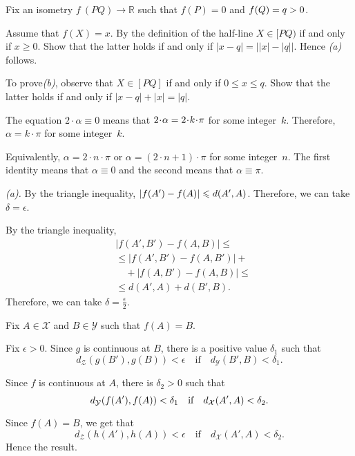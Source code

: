 \begin{multicols}{2}
Fix an isometry $f\:(P Q)\to \mathbb{R}$ such that $f(P)=0$ and $f(Q)\z=q>0$.

Assume that $f(X)=x$.
By the definition of the half-line $X\in[PQ)$ if and only if $x\ge 0$.
Show that the latter holds if and only if 
$|x-q|=\bigl||x|-|q|\bigr|$.
Hence \textit{(a)} follows.

To prove\textit{(b)}, observe that $X\in [PQ]$ if and only if $0\le x\le q$.
Show that the latter holds if and only if 
$|x-q|+|x|=|q|$.

The equation
$2\cdot\alpha\equiv 0$
means that $2\cdot\alpha\z=2\cdot k\cdot\pi$ for some integer~$k$.
Therefore,
$\alpha=k\cdot\pi$ for some integer~$k$.

Equivalently, $\alpha=2\cdot n\cdot \pi$ or $\alpha=(2\cdot n+1)\cdot \pi$ for some integer~$n$.
The first identity means that $\alpha\equiv 0$ and the second means that $\alpha\equiv \pi$.

 \textit{(a).}
By the triangle inequality,
$|f(A')\z-f(A)|\le d(A',A)$.
Therefore, we can take $\delta=\epsilon$.

By the triangle inequality,
\begin{align*}
&|f(A',B')-f(A,B)|
\le 
\\
&\le|f(A',B')-f(A,B')|+
\\
&\quad+
|f(A,B')-f(A,B)|\le
\\
&\le d(A',A)+d(B',B).
\end{align*}
Therefore, we can take $\delta=\tfrac\epsilon2$.

Fix $A\in \mathcal{X}$ and $B\in\mathcal{Y}$
such that $f(A)=B$.

Fix $\epsilon>0$.
Since $g$ is continuous at $B$, there is a positive value $\delta_1$ such that 
$$d_{\mathcal{Z}}(g(B'),g(B))<\epsilon
\quad
\text{if}
\quad
d_{\mathcal{Y}}(B',B)<\delta_1.$$ 

Since $f$ is continuous at $A$, there is $\delta_2>0$ such that 
$$d_{\mathcal{Y}}(f(A'),f(A))\z<\delta_1
\quad
\text{if}
\quad
d_{\mathcal{X}}(A',A)<\delta_2.$$ 

Since $f(A)=B$, we get that
$$d_{\mathcal{Z}}(h(A'),h(A))<\epsilon
\quad
\text{if}
\quad
d_{\mathcal{X}}(A',A)<\delta_2.$$ 
Hence the result.

\setcounter{eqtn}{0}


\end{multicols}

